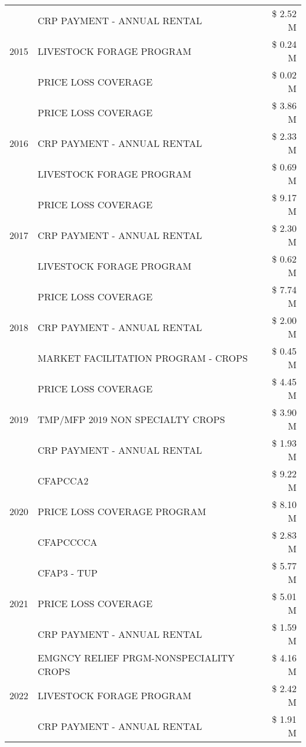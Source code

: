 \begin{tabular}{llr}
\cline{1-3}
\multirow[t]{3}{*}{2015} & CRP PAYMENT - ANNUAL RENTAL & \$ 2.52 M \\
 & LIVESTOCK FORAGE PROGRAM & \$ 0.24 M \\
 & PRICE LOSS COVERAGE & \$ 0.02 M \\
\cline{1-3}
\multirow[t]{3}{*}{2016} & PRICE LOSS COVERAGE & \$ 3.86 M \\
 & CRP PAYMENT - ANNUAL RENTAL & \$ 2.33 M \\
 & LIVESTOCK FORAGE PROGRAM & \$ 0.69 M \\
\cline{1-3}
\multirow[t]{3}{*}{2017} & PRICE LOSS COVERAGE & \$ 9.17 M \\
 & CRP PAYMENT - ANNUAL RENTAL & \$ 2.30 M \\
 & LIVESTOCK FORAGE PROGRAM & \$ 0.62 M \\
\cline{1-3}
\multirow[t]{3}{*}{2018} & PRICE LOSS COVERAGE & \$ 7.74 M \\
 & CRP PAYMENT - ANNUAL RENTAL & \$ 2.00 M \\
 & MARKET FACILITATION PROGRAM - CROPS & \$ 0.45 M \\
\cline{1-3}
\multirow[t]{3}{*}{2019} & PRICE LOSS COVERAGE & \$ 4.45 M \\
 & TMP/MFP 2019 NON SPECIALTY CROPS & \$ 3.90 M \\
 & CRP PAYMENT - ANNUAL RENTAL & \$ 1.93 M \\
\cline{1-3}
\multirow[t]{3}{*}{2020} & CFAPCCA2 & \$ 9.22 M \\
 & PRICE LOSS COVERAGE PROGRAM & \$ 8.10 M \\
 & CFAPCCCCA & \$ 2.83 M \\
\cline{1-3}
\multirow[t]{3}{*}{2021} & CFAP3 - TUP & \$ 5.77 M \\
 & PRICE LOSS COVERAGE & \$ 5.01 M \\
 & CRP PAYMENT - ANNUAL RENTAL & \$ 1.59 M \\
\cline{1-3}
\multirow[t]{3}{*}{2022} & EMGNCY RELIEF PRGM-NONSPECIALITY CROPS & \$ 4.16 M \\
 & LIVESTOCK FORAGE PROGRAM & \$ 2.42 M \\
 & CRP PAYMENT - ANNUAL RENTAL & \$ 1.91 M \\
\cline{1-3}
\bottomrule
\end{tabular}
